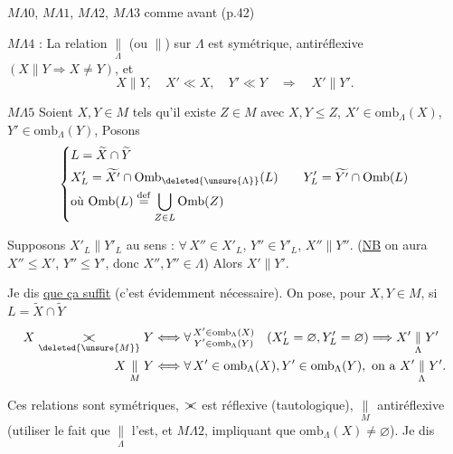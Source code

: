 \uline{$M\Lambda$}$0$, \uline{$M\Lambda$}$1$, \uline{$M\Lambda2$}, \uline{$M\Lambda3$} comme avant (p.42)

\uline{$M\Lambda4$} : La relation $\underset{\Lambda}{\parallel}$ (ou $\parallel$) sur $\Lambda$ est  symétrique, antiréflexive $(X\parallel Y\Longrightarrow X\ne Y)$, et
\[
X\parallel Y,\quad X'\ll X,\quad Y'\ll Y\quad\Longrightarrow\quad X'\parallel Y'.
\]

\uline{$M\Lambda5$} Soient $X,Y\in M$ tels qu'il existe $Z\in M$ avec $X,Y\leq Z$,  $X'\in\mathrm{omb}_{\Lambda}(X)$, $Y'\in\mathrm{omb}_{\Lambda}(Y)$,
Posons
\[
\left\{\begin{aligned}
&L=\widetilde X\cap\widetilde Y\\
&X'_L=\widetilde{X'}\cap\mathrm{Omb}_{\deleted{\unsure{\Lambda}}}(L)\qquad Y'_L=\widetilde{Y'}\cap\mathrm{Omb}(L)\\
&\text{où }\mathrm{Omb}(L)\overset{\mathrm{def}}{=}\bigcup_{Z\in L}\mathrm{Omb}(Z)
\end{aligned}\right.
\]

Supposons $X'_L\parallel Y'_L$ au sens : $\forall\,X''\in X'_L$, $Y''\in Y'_L$,  $X''\parallel Y''$. (\uline{NB} on aura $X''\leq X'$, $Y''\leq Y'$, donc $X'',Y''\in\Lambda$) Alors $X'\parallel Y'$.

Je dis \uline{que ça suffit} (c'est évidemment nécessaire).  On pose, pour $X,Y\in M$, si $L=\widetilde X\cap\widetilde Y$
\[
\begin{aligned}
X\underset{\deleted{\unsure{M}}}{\mathrel{\rlap{$>$}<}}Y&\Longleftrightarrow
\forall\,\substack{X'\in\mathrm{omb}_{\Lambda}(X)\\Y'\in\mathrm{omb}_{\Lambda}(Y)}
\quad(X'_L=\varnothing,Y'_L=\varnothing)\Longrightarrow X'\underset{\Lambda}{\parallel}Y'\\
X\underset{M}{\parallel}Y&\Longleftrightarrow
\forall\, X'\in\mathrm{omb}_{\Lambda}(X),Y'\in\mathrm{omb}_{\Lambda}(Y),\text{ on a } X'\underset{\Lambda}{\parallel}Y'.
\end{aligned}
\]

Ces relations sont symétriques,  $\mathrel{\rlap{$>$}<}$ est réflexive (tautologique), $\underset{M}{\parallel}$ antiréflexive (utiliser le fait que $\underset{\Lambda}{\parallel}$ l'est, et $M\Lambda2$, impliquant que $\mathrm{omb}_{\Lambda}(X)\ne\varnothing$). Je dis

